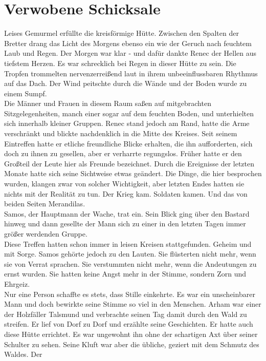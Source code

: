 \chapter{Verwobene Schicksale}

Leises Gemurmel erfüllte die kreisförmige Hütte. Zwischen den Spalten der Bretter drang das Licht 
des Morgens ebenso ein wie der Geruch nach feuchtem Laub und Regen. Der Morgen war klar - und dafür 
dankte Renec der Hellen aus tiefstem Herzen. Es war schrecklich bei Regen in dieser Hütte zu sein. 
Die Tropfen trommelten nervenzerreißend laut in ihrem unbeeinflussbaren Rhythmus auf das Dach. Der 
Wind peitschte durch die Wände und der Boden wurde zu einem Sumpf.\\
Die Männer und Frauen in diesem Raum saßen auf mitgebrachten Sitzgelegenheiten, manch einer sogar 
auf dem feuchten Boden, und unterhielten sich innerhalb kleiner Gruppen. Renec stand jedoch am Rand, 
hatte die Arme verschränkt und blickte nachdenklich in die Mitte des Kreises. Seit seinem Eintreffen 
hatte er etliche freundliche Blicke erhalten, die ihn aufforderten, sich doch zu ihnen zu gesellen, 
aber er verharrte regungslos. Früher hatte er den Großteil der Leute hier als Freunde bezeichnet. 
Durch die Ereignisse der letzten Monate hatte sich seine Sichtweise etwas geändert. Die Dinge, die 
hier besprochen wurden, klangen zwar von solcher Wichtigkeit, aber letzten Endes hatten sie nichts 
mit der Realität zu tun. Der Krieg kam. Soldaten kamen. Und das von beiden Seiten Merandilas.\\
Samos, der Hauptmann der Wache, trat ein. Sein Blick ging über den Bastard hinweg und dann gesellte 
der Mann sich zu einer in den letzten Tagen immer größer werdenden Gruppe.\\
Diese Treffen hatten schon immer in leisen Kreisen stattgefunden. Geheim und mit Sorge. Samos 
gehörte jedoch zu den Lauten. Sie flüsterten nicht mehr, wenn sie von Verrat sprachen. Sie 
verstummten nicht mehr, wenn die Andeutungen zu ernst wurden. Sie hatten keine Angst mehr in der 
Stimme, sondern Zorn und Ehrgeiz.\\
Nur eine Person schaffte es stets, dass Stille einkehrte. Es war ein unscheinbarer Mann und doch 
bewirkte seine Stimme so viel in den Menschen. Arham war einer der Holzfäller Talsmund und 
verbrachte seinen Tag damit durch den Wald zu streifen. Er lief von Dorf zu Dorf und erzählte seine 
Geschichten. Er hatte auch diese Hütte errichtet. Es war ungewohnt ihn ohne der schartigen Axt über 
seiner Schulter zu sehen. Seine Kluft war aber die übliche, geziert mit dem Schmutz des Waldes. Der 
